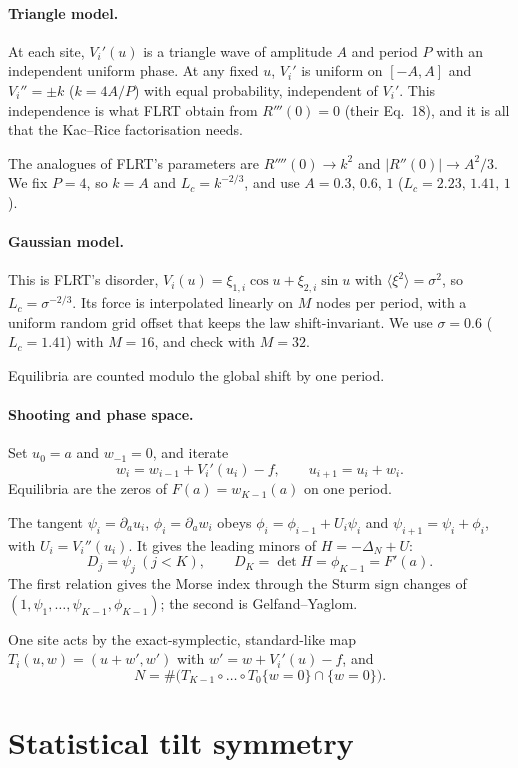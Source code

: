 \documentclass[10pt,a4paper]{article}
\begin{document}
\paragraph{Triangle model.}
At each site, $V_i'(u)$ is a triangle wave of amplitude $A$ and period $P$ with an independent uniform phase.
At any fixed $u$, $V_i'$ is uniform on $[-A,A]$ and $V_i''=\pm k$ ($k=4A/P$) with equal probability, independent of $V_i'$.
This independence is what FLRT obtain from $R'''(0)=0$ (their Eq.~18), and it is all that the Kac--Rice factorisation needs.

The analogues of FLRT's parameters are $R''''(0)\to k^2$ and $|R''(0)|\to A^2/3$.
We fix $P=4$, so $k=A$ and $L_c=k^{-2/3}$, and use $A=0.3,\,0.6,\,1$ ($L_c=2.23,\,1.41,\,1$).

\paragraph{Gaussian model.}
This is FLRT's disorder, $V_i(u)=\xi_{1,i}\cos u+\xi_{2,i}\sin u$ with $\langle\xi^2\rangle=\sigma^2$, so $L_c=\sigma^{-2/3}$.
Its force is interpolated linearly on $M$ nodes per period, with a uniform random grid offset that keeps the law shift-invariant.
We use $\sigma=0.6$ ($L_c=1.41$) with $M=16$, and check with $M=32$.

Equilibria are counted modulo the global shift by one period.

\paragraph{Shooting and phase space.}
Set $u_0=a$ and $w_{-1}=0$, and iterate
\[
w_i=w_{i-1}+V_i'(u_i)-f,\qquad u_{i+1}=u_i+w_i .
\]
Equilibria are the zeros of $F(a)=w_{K-1}(a)$ on one period.

The tangent $\psi_i=\partial_au_i$, $\phi_i=\partial_aw_i$ obeys $\phi_i=\phi_{i-1}+U_i\psi_i$ and $\psi_{i+1}=\psi_i+\phi_i$, with $U_i=V_i''(u_i)$.
It gives the leading minors of $H=-\Delta_N+U$:
\[
D_j=\psi_j\ (j<K),\qquad D_K=\det H=\phi_{K-1}=F'(a).
\]
The first relation gives the Morse index through the Sturm sign changes of $(1,\psi_1,\dots,\psi_{K-1},\phi_{K-1})$; the second is Gelfand--Yaglom.

One site acts by the exact-symplectic, standard-like map $T_i(u,w)=(u+w',w')$ with $w'=w+V_i'(u)-f$, and
\[
N=\#\big(T_{K-1}\circ\dots\circ T_0\{w=0\}\cap\{w=0\}\big).
\]

\section{Statistical tilt symmetry}\label{sec:sts}
\end{document}
